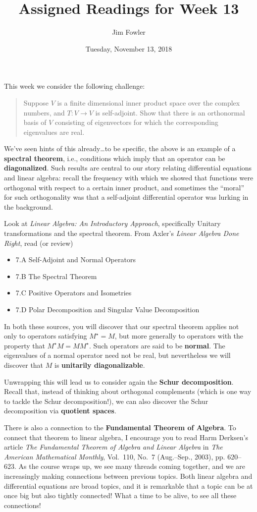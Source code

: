 \documentclass{homework}
\author{Jim Fowler}
\title{Assigned Readings for Week 13}
\date{Tuesday, November 13, 2018}
\begin{document}
\maketitle

This week we consider the following challenge:
\begin{quote}
  Suppose $V$ is a finite dimensional inner product space over the
  complex numbers, and $T : V \to V$ is self-adjoint.  Show that there
  is an orthonormal basis of $V$ consisting of eigenvectors for which
  the corresponding eigenvalues are real.
\end{quote}
We've seen hints of this already\ldots to be specific, the above is an
example of a \textbf{spectral theorem}, i.e., conditions which imply
that an operator can be \textbf{diagonalized}.  Such results are
central to our story relating differential equations and linear
algebra: recall the frequency with which we showed that functions were
orthogonal with respect to a certain inner product, and sometimes the
``moral'' for such orthogonality was that a self-adjoint differential
operator was lurking in the background.

Look at \textit{Linear Algebra: An
  Introductory Approach}, specifically  Unitary transformations and the spectral theorem.
From Axler's \textit{Linear Algebra Done Right}, read (or review)
\begin{itemize}
\item \textsection 7.A Self-Adjoint and Normal Operators
\item \textsection 7.B The Spectral Theorem
\item \textsection 7.C Positive Operators and Isometries
\item \textsection 7.D Polar Decomposition and Singular Value Decomposition
\end{itemize}

In both these sources, you will discover that our spectral theorem
applies not only to operators satisfying $M^\star = M$, but more
generally to operators with the property that $M^\star M = M M^\star$.
Such operators are said to be \textbf{normal}.  The eigenvalues of a
normal operator need not be real, but nevertheless we will discover
that $M$ is \textbf{unitarily diagonalizable}.

Unwrapping this will lead us to consider again the \textbf{Schur
  decomposition}.  Recall that, instead of
thinking about orthogonal complements (which is one way to
tackle the Schur decomposition!), we can also discover the Schur decomposition
via \textbf{quotient spaces}.

There is also a connection to the \textbf{Fundamental Theorem of
  Algebra}.  To connect that theorem to linear algebra, I encourage
you to read Harm Derksen's article \textit{The Fundamental Theorem of
  Algebra and Linear Algebra} in \textit{The American Mathematical
  Monthly}, Vol.~110, No.~7 (Aug.--Sep., 2003), pp. 620--623.
As the course wraps up, we see many threads coming together, and we
are increasingly making connections between previous topics.  Both
linear algebra and differential equations are broad topics, and it is
remarkable that a topic can be at once big but also tightly connected!
What a time to be alive, to see all these connections!
\end{document}
